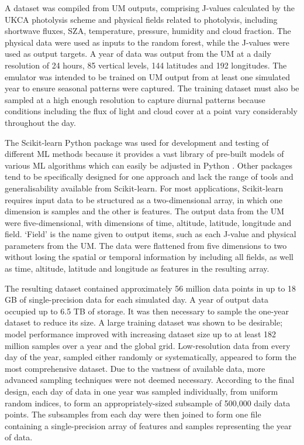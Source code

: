 \documentclass[journal abbreviation, manuscript]{copernicus}
\begin{document}
A dataset was compiled from UM outputs, comprising J-values calculated by the UKCA photolysis scheme and physical fields related to photolysis, including shortwave fluxes, SZA, temperature, pressure, humidity and cloud fraction. 
The physical data were used as inputs to the random forest, while the J-values were used as output targets.
A year of data was output from the UM at a daily resolution of 24 hours, 85 vertical levels, 144 latitudes and 192 longitudes.
The emulator was intended to be trained on UM output from at least one simulated year to ensure seasonal patterns were captured. The training dataset must also be sampled at a high enough resolution to capture diurnal patterns because conditions including the flux of light and cloud cover at a point vary considerably throughout the day.

The Scikit-learn Python package was used for development and testing of different ML methods because it provides a vast library of pre-built models of various ML algorithms which can easily be adjusted in Python \citep{pedregosa_scikit-learn_2011}. Other packages tend to be specifically designed for one approach and lack the range of tools and generalisability available from Scikit-learn. For most applications, Scikit-learn requires input data to be structured as a two-dimensional array, in which one dimension is samples and the other is features. The output data from the UM were five-dimensional, with dimensions of time, altitude, latitude, longitude and field. `Field' is the name given to output items, such as each J-value and physical parameters from the UM. The data were flattened from five dimensions to two without losing the spatial or temporal information by including all fields, as well as time, altitude, latitude and longitude as features in the resulting array.

The resulting dataset contained approximately 56 million data points in up to 18 GB of single-precision data for each simulated day. A year of output data occupied up to 6.5 TB of storage. It was then necessary to sample the one-year dataset to reduce its size.
A large training dataset was shown to be desirable; model performance improved with increasing dataset size up to at least 182 million samples over a year and the global grid.
Low-resolution data from every day of the year, sampled either randomly or systematically, appeared to form the most comprehensive dataset. Due to the vastness of available data, more advanced sampling techniques were not deemed necessary.
According to the final design, each day of data in one year was sampled individually, from uniform random indices, to form an appropriately-sized subsample of 500,000 daily data points. The subsamples from each day were then joined to form one file containing a single-precision array of features and samples representing the year of data.
\end{document}
